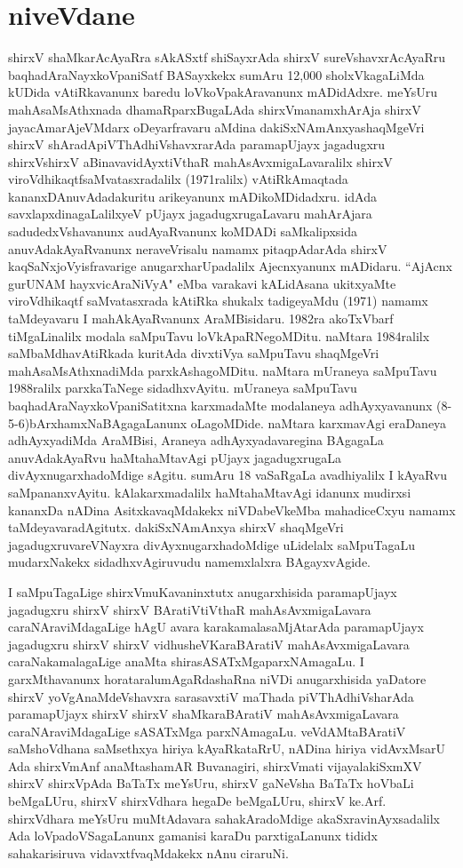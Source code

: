 \chapter{niveVdane}

shirxV shaMkarAcAyaRra sAkASxtf shiSayxrAda shirxV sureVshavxrAcAyaRru baqhadAraNayxkoVpaniSatf BASayxkekx sumAru 12,000 sholxVkagaLiMda kUDida vAtiRkavanunx baredu loVkoVpakAravanunx mADidAdxre. meYsUru mahAsaMsAthxnada dhamaRparxBugaLAda shirxVmanamxhArAja shirxV jayacAma\-rAjeVMdarx oDeyarfravaru aMdina dakiSxNAmAnxya\break shaqMgeVri shirxV shAradApiVThAdhiVshavxrarAda paramapUjayx jagadugxru shirxVshirxV aBinavavidAyxtiVthaR mahAsAvxmigaLavaralilx shirxV viroVdhikaqtf\break saMvatasxradalilx (1971ralilx) vAtiRkAmaqtada kananxDAnuvAdada\break kuritu arikeyanunx mADikoMDidadxru. idAda savxlapxdinagaLalilxyeV pUjayx jagadugxrugaLavaru mahArAjara sadudedxVshavanunx audAyaRvanunx koMDADi saMkalipxsida anuvAdakAyaRvanunx neraveVrisalu namamx pitaqpAdarAda shirxV kaqSaNxjoVyisfravarige anugarxharUpadalilx Ajecnxyanunx mADidaru. “AjAcnx gurUNAM hayxvicAraNiVyA" eMba varakavi kALidAsana ukitxyaMte viroVdhikaqtf saMvatasxrada kAtiRka shukalx tadigeyaMdu (1971) namamx taMdeyavaru I mahAkAyaRvanunx AraMBisidaru. 1982ra akoTxVbarf tiMgaLinalilx modala saMpuTavu loVkApaRNegoMDitu. naMtara 1984ralilx saMbaMdhavAtiRkada kuritAda divxtiVya saMpuTavu shaqMgeVri mahAsaMsAthxnadiMda parxkAshagoMDitu. naMtara mUraneya saMpuTavu 1988ralilx parxkaTaNege sidadhxvAyitu. mUraneya saMpuTavu baqhadAraNayx\-\break koVpaniSatitxna karxmadaMte modalaneya adhAyxya\-vanunx (8-5-6)\break bArxhamxNaBAgagaLanunx oLagoMDide. naMtara karxmavAgi eraDaneya adhAyxyadiMda AraMBisi, Araneya adhAyxyadavaregina BAgagaLa anuvAdakAyaRvu haMtahaMtavAgi pUjayx jagadugxrugaLa divAyxnu\-garxhadoMdige sAgitu. sumAru 18 vaSaRgaLa avadhiyalilx I kAyaRvu saMpananxvAyitu.
\newpage
kAlakarxmadalilx haMtahaMtavAgi idanunx mudirxsi kananxDa nADina AsitxkavaqMdakekx niVDabeVkeMba mahadiceCxyu namamx taMdeyavaradAgitutx. dakiSxNAmAnxya shirxV shaqMgeVri jagadugxruvareVNayxra divAyxnugarxha\-\break doMdige uLidelalx saMpuTagaLu mudarxNakekx sidadhxvAgiruvudu namemxlalxra BAgayxvAgide.

I saMpuTagaLige shirxVmuKavaninxtutx anugarxhisida paramapUjayx jagadugxru shirxV shirxV BAratiVtiVthaR mahAsAvxmigaLavara caraNAraviMdagaLige hAgU avara karakamalasaMjAtarAda paramapUjayx jagadugxru shirxV shirxV vidhusheVKaraBAratiV mahAsAvxmigaLavara caraNakamalagaLige anaMta shirasASATxMgaparxNAmagaLu. I garxMthavanunx horataralu\break mAgaRdashaRna niVDi anugarxhisida yaDatore shirxV yoVgAnaMdeVshavxra sarasavxtiV maThada piVThAdhiVsharAda paramapUjayx shirxV shirxV shaMkaraBAratiV mahAsAvxmigaLavara caraNAraviMdagaLige sASATxMga parxNAmagaLu. veVdAMtaBAratiV saMshoVdhana saMsethxya hiriya kAyaRkataRrU, nADina hiriya vidAvxMsarU Ada shirxVmAnf anaMtashamAR Buvanagiri, shirxVmati vijayalakiSxmXV shirxV shirxVpAda BaTaTx meYsUru, shirxV gaNeVsha BaTaTx hoVbaLi beMgaLUru, shirxV shirxVdhara hegaDe beMgaLUru, shirxV ke.Arf. shirxVdhara meYsUru muMtAdavara sahakAradoMdige akaSxravinAyxsadalilx Ada loVpadoVSagaLanunx gamanisi karaDu parxtigaLanunx tididx sahakarisiruva vidavxtfvaqMdakekx nAnu ciraruNi. 


